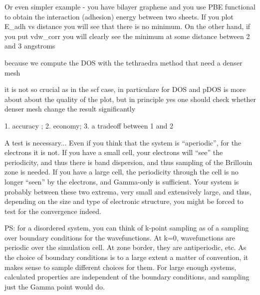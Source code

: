   Or even simpler example - you have bilayer graphene and you use PBE functional to obtain the interaction (adhesion) energy between two sheets. If you plot E\_adh vs distance you will see that there is no minimum. On the other hand, if you put vdw\_corr you will clearly see the minimum at some distance between 2 and 3 angstroms


  because we compute the DOS with the tethraedra method that need a denser mesh

  it is not so crucial as in the scf case, in particulare for DOS and pDOS is more about about the quality of the plot, but in principle yes one should check whether denser mesh change the result significantly


  1. accuracy ; 2. economy; 3. a tradeoff between 1 and 2


  A test is necessary... Even if you think that the system is “aperiodic”, for the electrons it is not. If you have a small cell, your electrons will “see” the periodicity, and thus there is band dispersion, and thus sampling of the Brillouin zone is needed. If you have a large cell, the periodicity through the cell is no longer “seen” by the electrons, and Gamma-only is sufficient. Your system is probably between these two extrema, very small and extensively large, and thus, depending on the size and type of electronic structure, you might be forced to test for the convergence indeed.

  PS: for a disordered system, you can think of k-point sampling as of a sampling over boundary conditions for the wavefunctions. At k=0, wavefunctions are periodic over the simulation cell. At zone border, they are antiperiodic, etc. As the choice of boundary conditions is to a large extent a matter of convention, it makes sense to sample different choices for them. For large enough systems, calculated properties are independent of the boundary conditions, and sampling just the Gamma point would do.



